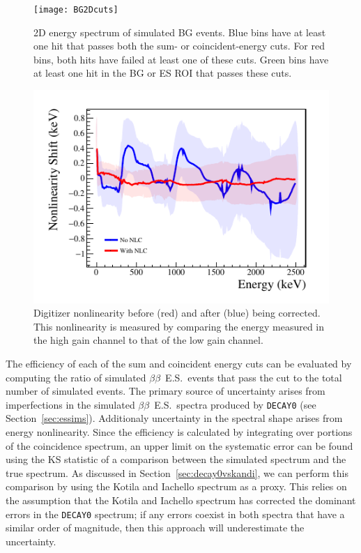 \documentclass[notitlepage,rmp,aps,10pt]{revtex4-1}
\newcommand{\bb}{${\beta \beta}$}
\newcommand{\bbes}{\bb~E.S.}
\begin{document}
\begin{figure}[h]
  \centering
  \texttt{[image: BG2Dcuts]}
  \caption[2D energy spectrum of simulated BG events]{\label{fig:2Dcuts}
    2D energy spectrum of simulated BG events. Blue bins have at least one hit that passes both the sum- or coincident-energy cuts. For red bins, both hits have failed at least one of these cuts. Green bins have at least one hit in the BG or ES ROI that passes these cuts.
    }
\end{figure}

\begin{figure}[h]
  \centering
  \includegraphics[width=0.8\linewidth]{DigitizerNonlinearity}
  \caption[Measured Digitizer Nonlinearity vs Energy]{\label{fig:dignonlin}
    Digitizer nonlinearity before (red) and after (blue) being corrected. This nonlinearity is measured by comparing the energy measured in the high gain channel to that of the low gain channel.
  }
\end{figure}
The efficiency of each of the sum and coincident energy cuts can be evaluated by computing the ratio of simulated \bbes\ events that pass the cut to the total number of simulated events.
The primary source of uncertainty arises from imperfections in the simulated \bbes\ spectra produced by \texttt{DECAY0} (see Section~\ref{sec:essims}).
Additionaly uncertainty in the spectral shape arises from energy nonlinearity.
Since the efficiency is calculated by integrating over portions of the coincidence spectrum, an upper limit on the systematic error can be found using the KS statistic of a comparison between the simulated spectrum and the true spectrum.
As discussed in Section~\ref{sec:decay0vskandi}, we can perform this comparison by using the Kotila and Iachello spectrum as a proxy.
This relies on the assumption that the Kotila and Iachello spectrum has corrected the dominant errors in the \texttt{DECAY0} spectrum; if any errors coexist in both spectra that have a similar order of magnitude, then this approach will underestimate the uncertainty.
\end{document}

